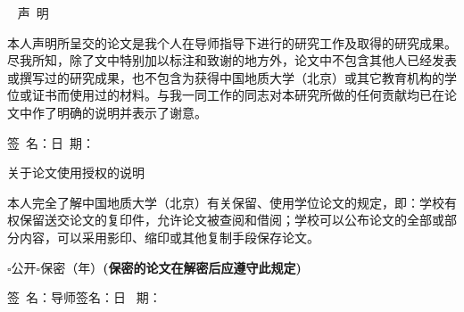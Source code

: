﻿%

{
\clearpage
\thispagestyle{empty}
\ 
\vskip 10pt
\heiti \LARGE \centering 声~明
\vskip 15pt
\songti \normalsize \raggedright \hspace{2em}本人声明所呈交的论文是我个人在导师指导下进行的研究工作及取得的研究成果。尽我所知，除了文中特别加以标注和致谢的地方外，论文中不包含其他人已经发表或撰写过的研究成果，也不包含为获得中国地质大学（北京）或其它教育机构的学位或证书而使用过的材料。与我一同工作的同志对本研究所做的任何贡献均已在论文中作了明确的说明并表示了谢意。

\vskip 60pt
\raggedleft \fontsize{13pt}{0pt}\selectfont 签~名：\underline{\hspace{3cm}}日~期： \underline{\hspace{3cm}}

\vskip 100pt
\centering \heiti \LARGE 关于论文使用授权的说明
\vskip 10pt

\songti \normalsize \raggedright \hspace{2em}本人完全了解中国地质大学（北京）有关保留、使用学位论文的规定，即：学校有权保留送交论文的复印件，允许论文被查阅和借阅；学校可以公布论文的全部或部分内容，可以采用影印、缩印或其他复制手段保存论文。
\vskip 20pt

\hspace{2em}$\square$公开\hspace{0.5cm}$\square$保密（\underline{\hspace{1cm}}年）\hspace{1cm}\fontsize{13pt}{0pt}\selectfont \textbf{(保密的论文在解密后应遵守此规定)}

\vskip 60pt
\songti \fontsize{13pt}{0pt}\selectfont 签~名：\underline{\hspace{3cm}}导师签名：\underline{\hspace{3cm}}日~ 期：\underline{\hspace{3cm}}	    	
}
